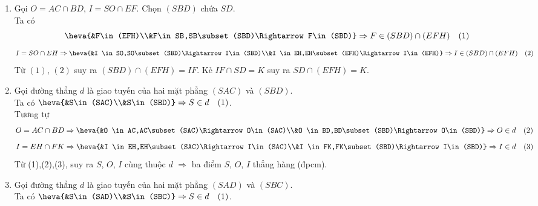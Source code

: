 \begin{bt}
\begin{bt}
{\begin{center}
		\end{center}
		\begin{enumerate}
			\item Gọi $O=AC\cap BD$, $I=SO\cap EF$. Chọn $(SBD)$ chứa $SD$.\\
			Ta có $$\heva{&F\in (EFH)\\&F\in SB,SB\subset (SBD)\Rightarrow F\in(SBD)}\Rightarrow F\in(SBD)\cap(EFH)\quad(1)$$ 
			$$I=SO\cap EH \Rightarrow \heva{&I \in SO,SO\subset (SBD)\Rightarrow I\in(SBD)\\&I \in EH,EH\subset (EFH)\Rightarrow I\in(EFH)}\Rightarrow I\in(SBD)\cap(EFH)\quad(2)$$	
			Từ $(1)$, $(2)$ suy ra $(SBD)\cap(EFH)=IF$. Kẻ $IF\cap SD=K$ suy ra $SD\cap(EFH)=K$.
			\item Gọi đường thẳng $d$ là giao tuyến của hai mặt phẳng $(SAC)$ và $(SBD)$.\\
			Ta có 
			$\heva{&S\in(SAC)\\&S\in(SBD)}\Rightarrow S\in d\quad (1)$.\\
			Tương tự
			$$O=AC\cap BD \Rightarrow \heva{&O \in AC,AC\subset (SAC)\Rightarrow O\in(SAC)\\&O \in BD,BD\subset (SBD)\Rightarrow O\in(SBD)}\Rightarrow O\in d\quad (2)$$
			$$I=EH\cap FK \Rightarrow \heva{&I \in EH,EH\subset (SAC)\Rightarrow I\in(SAC)\\&I \in FK,FK\subset (SBD)\Rightarrow I\in(SBD)}\Rightarrow I\in d\quad (3)$$
			Từ (1),(2),(3), suy ra $S$, $O$, $I$ cùng thuộc $d$ $\Rightarrow$ ba điểm $S$, $O$, $I$ thẳng hàng (đpcm).
			\item Gọi đường thẳng $d$ là giao tuyến của hai mặt phẳng $(SAD)$ và $(SBC)$.\\
			Ta có 
			$\heva{&S\in(SAD)\\&S\in(SBC)}\Rightarrow S\in d\quad (1)$.\\

\end{enumerate}}
\end{bt}
\end{bt}
